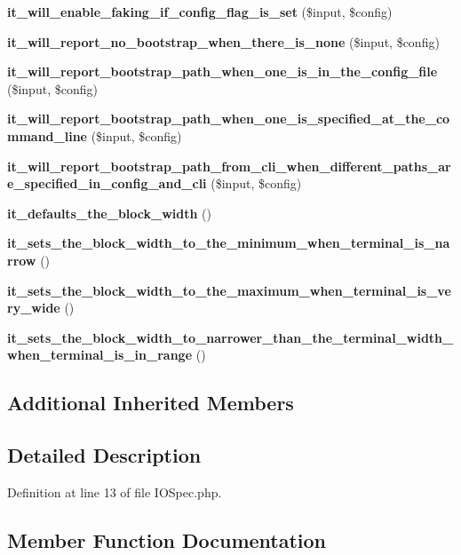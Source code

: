 \begin{DoxyCompactItemize}
\item 
{\bf it\+\_\+will\+\_\+enable\+\_\+faking\+\_\+if\+\_\+config\+\_\+flag\+\_\+is\+\_\+set} (\$input, \$config)
\item 
{\bf it\+\_\+will\+\_\+report\+\_\+no\+\_\+bootstrap\+\_\+when\+\_\+there\+\_\+is\+\_\+none} (\$input, \$config)
\item 
{\bf it\+\_\+will\+\_\+report\+\_\+bootstrap\+\_\+path\+\_\+when\+\_\+one\+\_\+is\+\_\+in\+\_\+the\+\_\+config\+\_\+file} (\$input, \$config)
\item 
{\bf it\+\_\+will\+\_\+report\+\_\+bootstrap\+\_\+path\+\_\+when\+\_\+one\+\_\+is\+\_\+specified\+\_\+at\+\_\+the\+\_\+command\+\_\+line} (\$input, \$config)
\item 
{\bf it\+\_\+will\+\_\+report\+\_\+bootstrap\+\_\+path\+\_\+from\+\_\+cli\+\_\+when\+\_\+different\+\_\+paths\+\_\+are\+\_\+specified\+\_\+in\+\_\+config\+\_\+and\+\_\+cli} (\$input, \$config)
\item 
{\bf it\+\_\+defaults\+\_\+the\+\_\+block\+\_\+width} ()
\item 
{\bf it\+\_\+sets\+\_\+the\+\_\+block\+\_\+width\+\_\+to\+\_\+the\+\_\+minimum\+\_\+when\+\_\+terminal\+\_\+is\+\_\+narrow} ()
\item 
{\bf it\+\_\+sets\+\_\+the\+\_\+block\+\_\+width\+\_\+to\+\_\+the\+\_\+maximum\+\_\+when\+\_\+terminal\+\_\+is\+\_\+very\+\_\+wide} ()
\item 
{\bf it\+\_\+sets\+\_\+the\+\_\+block\+\_\+width\+\_\+to\+\_\+narrower\+\_\+than\+\_\+the\+\_\+terminal\+\_\+width\+\_\+when\+\_\+terminal\+\_\+is\+\_\+in\+\_\+range} ()
\end{DoxyCompactItemize}
\subsection*{Additional Inherited Members}


\subsection{Detailed Description}


Definition at line 13 of file I\+O\+Spec.\+php.



\subsection{Member Function Documentation}
